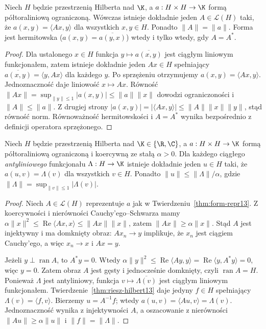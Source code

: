 \begin{twierdzenie}
\label{thm:form-repr13}
Niech $H$ będzie przestrzenią Hilberta nad $\K$,
a $a:H\times H\to\K$ formą półtoraliniową ograniczoną.
Wówczas istnieje dokładnie jeden $A\in\mathcal L(H)$ taki, że
$a(x,y)=\langle Ax,y\rangle$ dla wszystkich $x,y\in H$.
Ponadto $\|A\|=\|a\|$.
Forma jest hermitowska ($a(x,y)=\overline{a(y,x)}$) wtedy
i tylko wtedy, gdy $A=A^*$.
\end{twierdzenie}
\begin{proof}
Dla ustalonego $x\in H$ funkcja
$y\mapsto\overline{a(x,y)}$ jest ciągłym liniowym funkcjonałem,
zatem istnieje dokładnie jeden $Ax\in H$ spełniający
$\overline{a(x,y)}=\langle y,Ax\rangle$ dla każdego $y$.
Po sprzężeniu otrzymujemy $a(x,y)=\langle Ax,y\rangle$.
Jednoznaczność daje liniowość $x\mapsto Ax$.
Równość $\|Ax\|=\sup_{\|y\|\le1}|a(x,y)|\le\|a\|\|x\|$
dowodzi ograniczoności i $\|A\|\le\|a\|$.
Z drugiej strony
$|a(x,y)|=|\langle Ax,y\rangle|\le\|A\|\|x\|\|y\|$,
stąd równość norm. Równoważność hermitowskości i $A=A^*$
wynika bezpośrednio z definicji operatora sprzężonego.
\end{proof}

\begin{twierdzenie}
\label{thm:lax-milgram13}
Niech $H$ będzie przestrzenią Hilberta nad $\K\in\{\R,\C\}$,
a $a:H\times H\to\K$ formą półtoraliniową ograniczoną
i koercywną ze stałą $\alpha>0$. Dla każdego ciągłego
\emph{antyliniowego} funkcjonału $\Lambda:H\to\K$ istnieje
dokładnie jeden $u\in H$ taki, że
$a(u,v)=\Lambda(v)$ dla wszystkich $v\in H$.
Ponadto $\|u\|\le\|\Lambda\|/\alpha$, gdzie
$\|\Lambda\|=\sup_{\|v\|\le1}|\Lambda(v)|$.
\end{twierdzenie}
\begin{proof}
Niech $A\in\mathcal L(H)$ reprezentuje $a$ jak w
Twierdzeniu~\ref{thm:form-repr13}. Z koercywności i nierówności
Cauchy'ego--Schwarza mamy
$\alpha\|x\|^2\le\operatorname{Re}\langle Ax,x\rangle
\le\|Ax\|\|x\|$, zatem $\|Ax\|\ge\alpha\|x\|$.
Stąd $A$ jest injektywny i ma domknięty obraz:
$Ax_n\to y$ implikuje, że $x_n$ jest ciągiem Cauchy'ego,
a więc $x_n\to x$ i $Ax=y$.

Jeżeli $y\perp\operatorname{ran}A$, to $A^*y=0$.
Wtedy
$\alpha\|y\|^2\le\operatorname{Re}\langle Ay,y\rangle
=\operatorname{Re}\langle y,A^*y\rangle=0$,
więc $y=0$. Zatem obraz $A$ jest gęsty i jednocześnie
domknięty, czyli $\operatorname{ran}A=H$.
Ponieważ $\Lambda$ jest antyliniowy, funkcja
$v\mapsto\overline{\Lambda(v)}$ jest ciągłym liniowym
funkcjonałem. Twierdzenie~\ref{thm:riesz-hilbert13} daje
jedyny $f\in H$ spełniający $\Lambda(v)=\langle f,v\rangle$.
Bierzemy $u=A^{-1}f$; wtedy $a(u,v)=\langle Au,v\rangle
=\Lambda(v)$. Jednoznaczność wynika z injektywności $A$,
a oszacowanie z nierówności $\|Au\|\ge\alpha\|u\|$
i $\|f\|=\|\Lambda\|$.
\end{proof}

